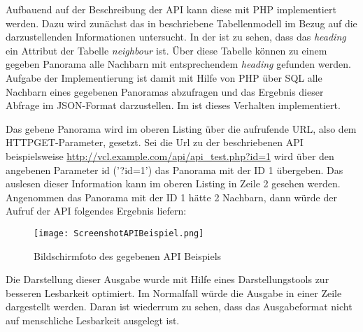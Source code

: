 
Aufbauend auf der Beschreibung der API kann diese mit PHP implementiert werden. Dazu wird zunächst das in  beschriebene Tabellenmodell im Bezug auf die darzustellenden Informationen untersucht. In der  ist zu sehen, dass das \textit{heading} ein Attribut der Tabelle \textit{neighbour} ist. Über diese Tabelle können zu einem gegeben Panorama alle Nachbarn mit entsprechendem \textit{heading} gefunden werden. Aufgabe der Implementierung ist damit mit Hilfe von PHP über SQL alle Nachbarn eines gegebenen Panoramas abzufragen und das Ergebnis dieser Abfrage im JSON-Format darzustellen. Im  ist dieses Verhalten implementiert.



Das gebene Panorama wird im oberen Listing über die aufrufende URL, also dem HTTP\footnotemark GET-Parameter, gesetzt. Sei die Url zu der beschriebenen API beispielsweise \url{http://vcl.example.com/api/api\_test.php?id=1} wird über den angebenen Parameter id ('?id=1') das Panorama mit der ID 1 übergeben. Das auslesen dieser Information kann im oberen Listing in Zeile 2 gesehen werden. Angenommen das Panorama mit der ID 1 hätte 2 Nachbarn, dann würde der Aufruf der API folgendes Ergebnis liefern:


\begin{figure}[htb]
\centering
\texttt{[image: ScreenshotAPIBeispiel.png]}
\caption[API Beispiel]{Bildschirmfoto des gegebenen API Beispiels}
\label{fig:ScreenshotAPIBeispiel}
\end{figure}

Die Darstellung dieser Ausgabe wurde mit Hilfe eines Darstellungstools zur besseren Lesbarkeit optimiert. Im Normalfall würde die Ausgabe in einer Zeile dargestellt werden. Daran ist wiederrum zu sehen, dass das Ausgabeformat nicht auf menschliche Lesbarkeit ausgelegt ist.

